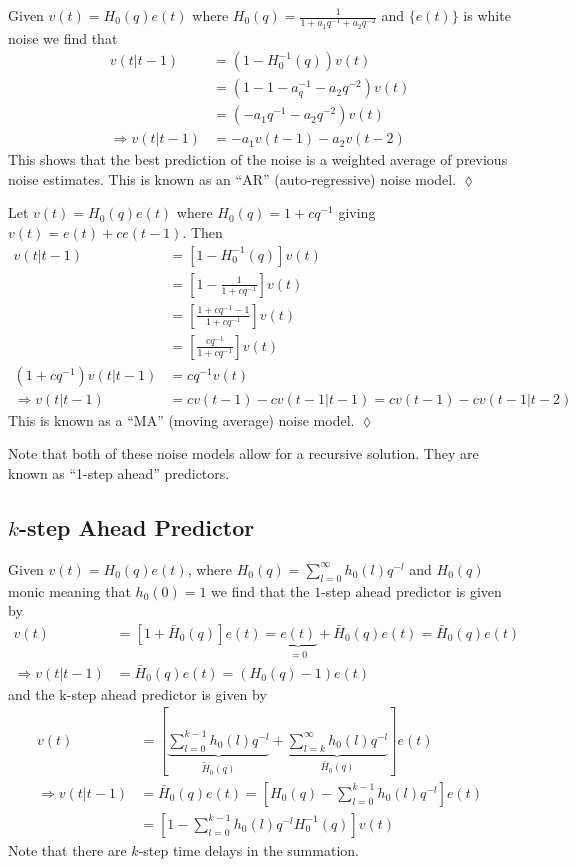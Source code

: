 \begin{example}
Given $v(t) = H_0(q)e(t)$ where $H_0(q) = \frac{1}{1+a_1q^{-1}+a_2q^{-2}}$ and $\{e(t)\}$ is white noise we find that
\begin{align*}
v(t|t-1) &= (1-H_0^{-1}(q))v(t) \\
&= (1-1-a_q^{-1}-a_2q^{-2})v(t) \\
&= (-a_1q^{-1}-a_2q^{-2})v(t) \\
\Rightarrow v(t|t-1) &= -a_1v(t-1)-a_2v(t-2)
\end{align*}
This shows that the best prediction of the noise is a weighted average of previous noise estimates.
This is known as an ``AR'' (auto-regressive) noise model.
$\lozenge$
\end{example}

\begin{example}
Let $v(t)=H_0(q)e(t)$ where $H_0(q)=1+cq^{-1}$ giving $v(t)=e(t)+ce(t-1)$.
Then
\begin{align*}
v(t|t-1) &= [1-H_0^{-1}(q)]v(t) \\
&= \left[1-\frac{1}{1+cq^{-1}}\right]v(t) \\
&= \left[\frac{1+cq^{-1}-1}{1+cq^{-1}}\right]v(t) \\
&= \left[\frac{cq^{-1}}{1+cq^{-1}}\right]v(t) \\
(1+cq^{-1})v(t|t-1) &= cq^{-1}v(t) \\
\Rightarrow v(t|t-1) &= cv(t-1)-cv(t-1|t-1) = cv(t-1)-cv(t-1|t-2)
\end{align*}
This is known as a ``MA'' (moving average) noise model.
$\lozenge$
\end{example}

Note that both of these noise models allow for a recursive solution.
They are known as ``1-step ahead'' predictors.

\subsection{$k$-step Ahead Predictor}
Given $v(t)=H_0(q)e(t)$, where $H_0(q)=\sum_{l=0}^\infty h_0(l)q^{-l}$ and $H_0(q)$ monic meaning that $h_0(0)=1$ we find that the $1$-step ahead predictor is given by
\begin{align*}
v(t) &= [1+\bar{H}_0(q)]e(t) = \underbrace{e(t)}_{=0}+\bar{H}_0(q)e(t) = \bar{H}_0(q)e(t) \\
\Rightarrow v(t|t-1) &= \bar{H}_0(q)e(t) = (H_0(q)-1)e(t)
\end{align*}
and the k-step ahead predictor is given by
\begin{align*}
v(t) &= \left[\underbrace{\sum_{l=0}^{k-1}h_0(l)q^{-l}}_{\tilde{H}_0(q)} + \underbrace{\sum_{l=k}^\infty h_0(l)q^{-l}}_{\bar{H}_0(q)}\right]e(t) \\
\Rightarrow v(t|t-1) &= \bar{H}_0(q)e(t) = \left[H_0(q)-\sum_{l=0}^{k-1}h_0(l)q^{-l}\right]e(t) \\
&= \left[1-\sum_{l=0}^{k-1}h_0(l)q^{-l}H_0^{-1}(q)\right]v(t)
\end{align*}
Note that there are $k$-step time delays in the summation.

